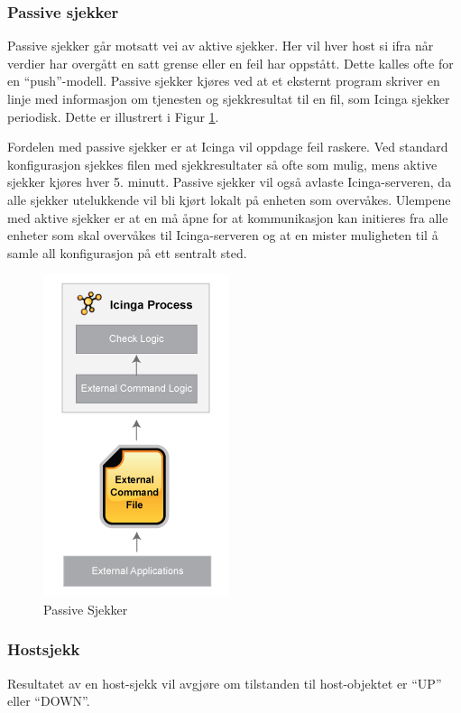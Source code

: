 \subsubsection{Passive sjekker}
Passive sjekker går motsatt vei av aktive sjekker. Her vil hver host si ifra når verdier har overgått en satt grense eller en feil har oppstått. Dette kalles ofte for en ``push''-modell. Passive sjekker kjøres ved at et eksternt program skriver en linje med informasjon om tjenesten og sjekkresultat til en fil, som Icinga sjekker periodisk. Dette er illustrert i Figur \ref{passive_checks}.

Fordelen med passive sjekker er at Icinga vil oppdage feil raskere. Ved standard konfigurasjon sjekkes filen med sjekkresultater så ofte som mulig, mens aktive sjekker kjøres hver 5. minutt. Passive sjekker vil også avlaste Icinga-serveren, da alle sjekker utelukkende vil bli kjørt lokalt på enheten som overvåkes. Ulempene med aktive sjekker er at en må åpne for at kommunikasjon kan initieres fra alle enheter som skal overvåkes til Icinga-serveren og at en mister muligheten til å samle all konfigurasjon på ett sentralt sted. 

\begin{figure}[H]
    \centering
    \includegraphics[scale=0.7]{img/passivechecks.png}
    \caption{Passive Sjekker}
    \label{passive_checks}
\end{figure}

\subsubsection{Hostsjekk}
Resultatet av en host-sjekk vil avgjøre om tilstanden til host-objektet er ``UP'' eller ``DOWN''. 


